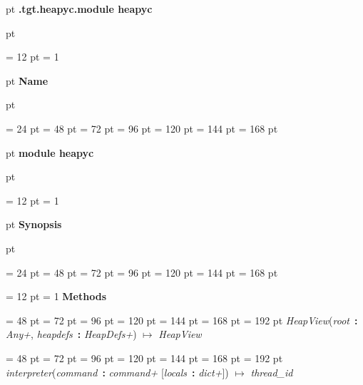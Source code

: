 {\par \pagebreak[3]  pt \noindent
{\LARGE {\bf .tgt.heapyc.module heapyc\/}}\par {} pt
} \noindent
{\par \noindent
{\par \pagebreak[3.300000] \noindent \hangindent = 12 pt \hangafter = 1 
{\par \pagebreak[3]  pt \noindent
{\Large {\bf Name\/}}\par {} pt
} \noindent
\par}
{\par \noindent  \leftskip = 24 pt  \leftmargini = 48 pt  \leftmarginii = 72 pt  \leftmarginiii = 96 pt  \leftmarginiv = 120 pt  \leftmarginv = 144 pt  \leftmarginvi = 168 pt {\par \pagebreak[3]  pt \noindent
{\Large {\bf module heapyc\/}}\par {} pt
} \noindent
\par}
{\par \pagebreak[3.300000] \noindent \hangindent = 12 pt \hangafter = 1 
{\par \pagebreak[3]  pt \noindent
{\Large {\bf Synopsis\/}}\par {} pt
} \noindent
\par}
{\par \noindent  \leftskip = 24 pt  \leftmargini = 48 pt  \leftmarginii = 72 pt  \leftmarginiii = 96 pt  \leftmarginiv = 120 pt  \leftmarginv = 144 pt  \leftmarginvi = 168 pt {\par \noindent
{\par \pagebreak[3.200000] \noindent \hangindent = 12 pt \hangafter = 1 
{\bf {\large {\bf Methods\/}}\/}\par}
{\par \noindent  \leftskip = 48 pt  \leftmargini = 72 pt  \leftmarginii = 96 pt  \leftmarginiii = 120 pt  \leftmarginiv = 144 pt  \leftmarginv = 168 pt  \leftmarginvi = 192 pt {\large  {\em HeapView\/}}({\em root\/}~{\bf :}  {\em Any+\/}, {\em heapdefs\/}~{\bf :}  {\em HeapDefs+\/}) \(\mapsto \)  {\em HeapView\/}\par}
{\par \noindent  \leftskip = 48 pt  \leftmargini = 72 pt  \leftmarginii = 96 pt  \leftmarginiii = 120 pt  \leftmarginiv = 144 pt  \leftmarginv = 168 pt  \leftmarginvi = 192 pt {\large  {\em interpreter\/}}({\em command\/}~{\bf :}  {\em command+\/}  {[}{\em locals\/}~{\bf :}  {\em dict+\/}]) \(\mapsto \)  {\em thread{\_}id\/}\par}
}}}

